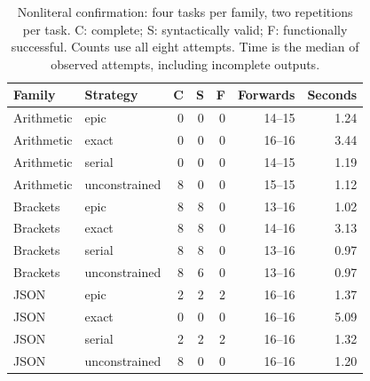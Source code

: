 \begin{table}[ht]
\centering\small
\caption{Nonliteral confirmation: four tasks per family, two repetitions per task. C: complete; S: syntactically valid; F: functionally successful. Counts use all eight attempts. Time is the median of observed attempts, including incomplete outputs.}
\label{tab:review-live}
\begin{tabular}{llrrrrr}\toprule
Family & Strategy & C & S & F & Forwards & Seconds\\ \midrule
Arithmetic & epic & 0 & 0 & 0 & 14--15 & 1.24 \\
Arithmetic & exact & 0 & 0 & 0 & 16--16 & 3.44 \\
Arithmetic & serial & 0 & 0 & 0 & 14--15 & 1.19 \\
Arithmetic & unconstrained & 8 & 0 & 0 & 15--15 & 1.12 \\
Brackets & epic & 8 & 8 & 0 & 13--16 & 1.02 \\
Brackets & exact & 8 & 8 & 0 & 14--16 & 3.13 \\
Brackets & serial & 8 & 8 & 0 & 13--16 & 0.97 \\
Brackets & unconstrained & 8 & 6 & 0 & 13--16 & 0.97 \\
JSON & epic & 2 & 2 & 2 & 16--16 & 1.37 \\
JSON & exact & 0 & 0 & 0 & 16--16 & 5.09 \\
JSON & serial & 2 & 2 & 2 & 16--16 & 1.32 \\
JSON & unconstrained & 8 & 0 & 0 & 16--16 & 1.20 \\
\bottomrule\end{tabular}
\end{table}
